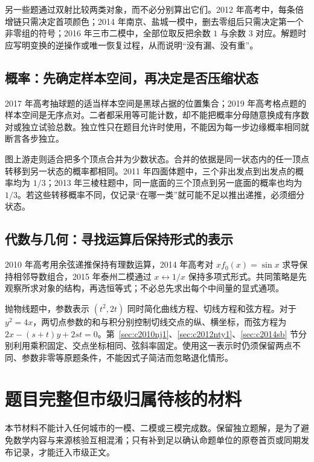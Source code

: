 \documentclass[UTF8]{ctexart}
\begin{document}
另一些题通过双射比较两类对象，而不必分别算出它们。2012 年高考中，每条倍增链只需决定首项颜色；2014 年南京、盐城一模中，删去零组后只需决定第一个非零组的符号；2016 年三市二模中，全部位取反把余数 $1$ 与余数 $3$ 对应。解题时应写明变换的逆操作或唯一恢复过程，从而说明“没有漏、没有重”。

\subsection{概率：先确定样本空间，再决定是否压缩状态}
2017 年高考抽球题的适当样本空间是黑球占据的位置集合；2019 年高考格点题的样本空间是无序点对。二者都采用等可能计数，却不能把概率分母随意换成有序数对或独立试验总数。独立性只在题目允许时使用，不能因为每一步边缘概率相同就断言各步独立。

图上游走则适合把多个顶点合并为少数状态。合并的依据是同一状态内的任一顶点转移到另一状态的概率都相同。2011 年四面体题中，三个非出发点到出发点的概率均为 $1/3$；2013 年三棱柱题中，同一底面的三个顶点到另一底面的概率也均为 $1/3$。若这些转移概率不同，仅记录“在哪一类”就可能不足以推出递推，必须细分状态。

\subsection{代数与几何：寻找运算后保持形式的表示}
2010 年高考用余弦递推保持有理数运算，2014 年高考对 $xf_0(x)=\sin x$ 求导保持相邻导数组合，2015 年泰州二模通过 $x\leftrightarrow1/x$ 保持多项式形式。共同策略是先观察所求对象的结构，再选恒等式；不必总先求出每个中间量的显式通项。

抛物线题中，参数表示 $(t^2,2t)$ 同时简化曲线方程、切线方程和弦方程。对于 $y^2=4x$，两切点参数的和与积分别控制切线交点的纵、横坐标，而弦方程为 $2x-(s+t)y+2st=0$。第~\ref{sec:c2010nj1}、\ref{sec:c2012nty1}、\ref{sec:c2014sb} 节分别利用乘积固定、交点坐标相同、弦斜率固定。使用这一表示时仍须保留两点不同、参数非零等原题条件，不能因式子简洁而忽略退化情形。

\section{题目完整但市级归属待核的材料}\label{sec:unattributed}
本节材料不能计入任何城市的一模、二模或三模完成数。保留独立题解，是为了避免数学内容与来源核验互相混淆；只有补到足以确认命题单位的原卷首页或同期发布记录，才能迁入市级正文。
\end{document}
